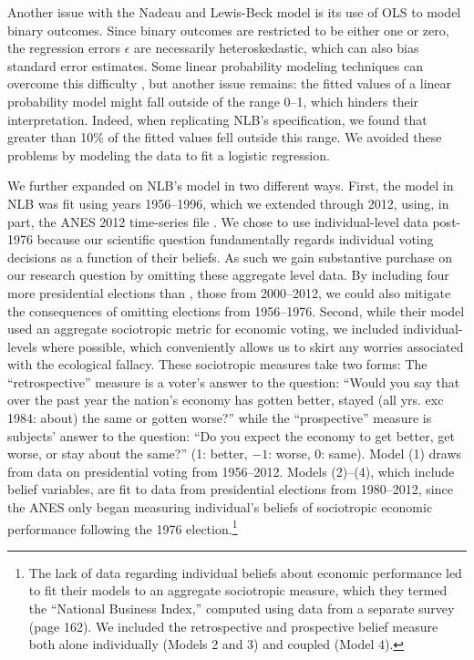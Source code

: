 \documentclass[11pt]{article}
\begin{document}
Another issue with the Nadeau and Lewis-Beck model is its use of OLS to model binary outcomes. Since binary outcomes are restricted to be either one or zero, the regression errors $\epsilon$ are necessarily heteroskedastic, which can also bias standard error estimates. Some linear probability modeling techniques can overcome this difficulty \citep[see, e.g.][ sec. 4.6]{agresti2002categorical}, but another issue remains: the fitted values of a linear probability model might fall outside of the range 0--1, which hinders their interpretation. Indeed, when replicating NLB's specification, we found that greater than 10\% of the fitted values fell outside this range. We avoided these problems by modeling the data to fit a logistic regression.%



We further expanded on NLB's model in two different ways. First, the model in NLB was fit using years 1956--1996, which we extended through 2012, using, in part, the ANES 2012 time-series file \cite{ANES2012}.
We chose to use individual-level data post-1976 because our scientific question fundamentally regards individual voting decisions as a function of their beliefs. As such we gain substantive purchase on our research question by omitting these aggregate level data. By including four more presidential elections than \citet{Nadeau:2001tw}, those from 2000--2012, we could also mitigate the consequences of omitting elections from 1956--1976.
Second, while their model used an aggregate sociotropic metric for economic voting, we included individual-levels where possible, which conveniently allows us to skirt any worries associated with the ecological fallacy. These sociotropic measures take two forms:
The ``retrospective'' measure is a voter's answer to the question: ``Would you say that over the past year the nation's economy has gotten better, stayed (all yrs. exc 1984: about) the same or gotten worse?'' while
 the ``prospective'' measure is subjects' answer to the question: ``Do you expect the economy to get better, get
worse, or stay about the same?'' (1: better, $-1$: worse, 0: same). Model (1) draws from data on presidential voting from 1956--2012. Models (2)--(4), which include belief variables, are fit to data from presidential elections from 1980--2012, since the ANES only began measuring individual's beliefs of sociotropic economic performance following the 1976 election.\footnote{The lack of data regarding individual beliefs about economic performance led \citet{Nadeau:2001tw} to fit their models to an aggregate sociotropic measure, which they termed the ``National Business Index,'' computed using data from a separate survey (page 162). We included the retrospective and prospective belief measure both alone individually (Models 2 and 3) and coupled (Model 4).}
\end{document}
